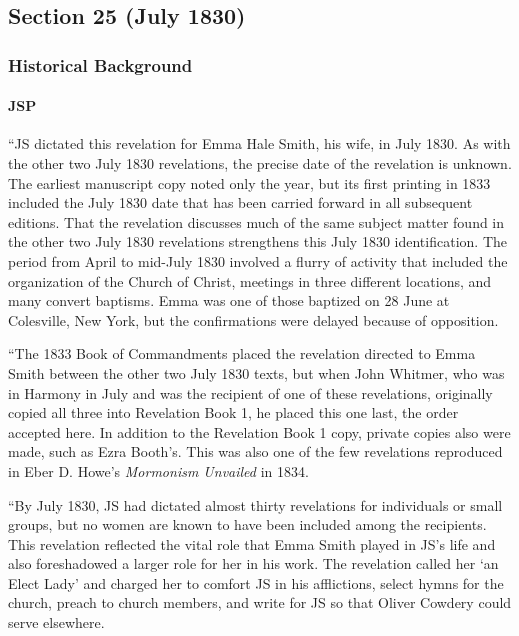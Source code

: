 \subsection{Section 25 (July 1830)}
	\label{DC25}
	
	\subsubsection{Historical Background}
		\label{DC25-HB}
		
		\paragraph{JSP}
		
			``JS dictated this revelation for Emma Hale Smith, his wife, in July 1830. As with the other two July 1830 revelations, the precise date of the revelation is unknown. The earliest manuscript copy noted only the year, but its first printing in 1833 included the July 1830 date that has been carried forward in all subsequent editions. That the revelation discusses much of the same subject matter found in the other two July 1830 revelations strengthens this July 1830 identification. The period from April to mid-July 1830 involved a flurry of activity that included the organization of the Church of Christ, meetings in three different locations, and many convert baptisms. Emma was one of those baptized on 28 June at Colesville, New York, but the confirmations were delayed because of opposition.

			``The 1833 Book of Commandments placed the revelation directed to Emma Smith between the other two July 1830 texts, but when John Whitmer, who was in Harmony in July and was the recipient of one of these revelations, originally copied all three into Revelation Book 1, he placed this one last, the order accepted here. In addition to the Revelation Book 1 copy, private copies also were made, such as Ezra Booth's. This was also one of the few revelations reproduced in Eber D. Howe's \textit{Mormonism Unvailed} in 1834.

			``By July 1830, JS had dictated almost thirty revelations for individuals or small groups, but no women are known to have been included among the recipients. This revelation reflected the vital role that Emma Smith played in JS's life and also foreshadowed a larger role for her in his work. The revelation called her `an Elect Lady' and charged her to comfort JS in his afflictions, select hymns for the church, preach to church members, and write for JS so that Oliver Cowdery could serve elsewhere.

